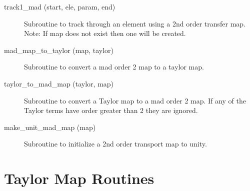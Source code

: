 \begin{description}
\item[track1\_mad (start, ele, param, end)] \Newline 
     Subroutine to track through an element using a 2nd order transfer map.
     Note: If map does not exist then one will be created. 

\item[mad\_map\_to\_taylor (map, taylor)] \Newline 
     Subroutine to convert a mad order 2 map to a taylor map.

\item[taylor\_to\_mad\_map (taylor, map)] \Newline 
     Subroutine to convert a Taylor map to a mad order 2 map.
     If any of the Taylor terms have order greater than 2 they are ignored.

\item[make\_unit\_mad\_map (map)] \Newline 
     Subroutine to initialize a 2nd order transport map to unity.


\end{description}

\section{Taylor Map Routines}
\label{r:taylor}   

